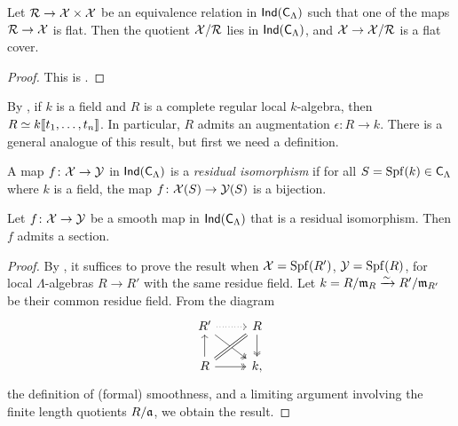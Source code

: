 \begin{theorem}\label{thm:quotients-ind}
Let $\mathcal{R}\to \mathcal{X}\times \mathcal{X}$ be an equivalence relation in 
$\operatorname{\mathsf{Ind}}(\mathsf{C}_\Lambda)$ such that one of the maps $\mathcal{R}\to \mathcal{X}$ is 
flat. Then the quotient $\mathcal{X}/\mathcal{R}$ lies in $\operatorname{\mathsf{Ind}}(\mathsf{C}_\Lambda)$, and 
$\mathcal{X}\to \mathcal{X}/\mathcal{R}$ is a flat cover. 
\end{theorem}
\begin{proof}
This is \cite[VII\textsubscript{B} 1.4]{sga3-1}. 
\end{proof}

By \cite[29.7]{matsumura-1989}, if $k$ is a field and $R$ is a complete regular 
local $k$-algebra, then $R\simeq k\llbracket t_1,\dots,t_n \rrbracket$. In particular, $R$ 
admits an augmentation $\epsilon\colon R\to k$. There is a general analogue of 
this result, but first we need a definition. 

\begin{definition}
A map $f\colon \mathcal{X}\to \mathcal{Y}$ in $\operatorname{\mathsf{Ind}}(\mathsf{C}_\Lambda)$ is a 
\emph{residual isomorphism} if for all $S=\operatorname{Spf}(k)\in \mathsf{C}_\Lambda$ where 
$k$ is a field, the map $f\colon \mathcal{X}(S)\to \mathcal{Y}(S)$ is a bijection. 
\end{definition}

\begin{lemma}\label{thm:smooth-section}
Let $f\colon \mathcal{X}\to \mathcal{Y}$ be a smooth map in $\operatorname{\mathsf{Ind}}(\mathsf{C}_\Lambda)$ 
that is a residual isomorphism. Then $f$ admits a section. 
\end{lemma}
\begin{proof}
By \cite[VII\textsubscript{B} 0.1.1]{sga3-1}, it suffices to prove the result 
when $\mathcal{X}=\operatorname{Spf}(R')$, $\mathcal{Y}=\operatorname{Spf}(R)$, for local $\Lambda$-algebras $R\to R'$ 
with the same residue field. Let $k=R/\mathfrak{m}_R \xrightarrow\sim R'/\mathfrak{m}_{R'}$ be their common 
residue field. From the diagram 
\[
\begin{tikzcd}
	R' \ar[r, dotted] \ar[dr, two heads]
		& R \ar[d, two heads] \\
	R \ar[u] \ar[ur, equal] \ar[r, two heads]
		& k ,
\end{tikzcd}
\]
the definition of (formal) smoothness, and a limiting argument involving the 
finite length quotients $R/\mathfrak{a}$, we obtain the result. 
\end{proof}


